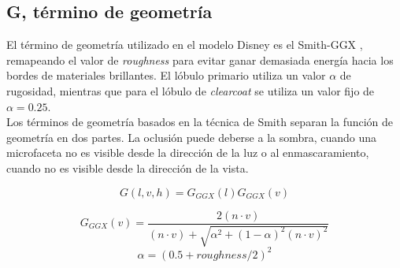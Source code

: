             \subsection*{G, t\'ermino de geometr\'ia}
                El t\'ermino de geometr\'ia utilizado en el modelo Disney \autocite{disney12} es el Smith-GGX \autocite{ggx}, remapeando el valor de \textit{roughness} para evitar
                ganar demasiada energ\'ia hacia los bordes de materiales brillantes. El l\'obulo primario utiliza un valor $\alpha$
                de rugosidad, mientras que para el l\'obulo de \textit{clearcoat} se utiliza un valor fijo de $\alpha = 0.25$.\\

                Los t\'erminos de geometr\'ia basados en la t\'ecnica de Smith \autocite{smith} separan la funci\'on de geometr\'ia en dos partes.
                La oclusi\'on puede deberse a la sombra, cuando una microfaceta no es visible desde la direcci\'on de la luz o al enmascaramiento,
                cuando no es visible desde la direcci\'on de la vista.
    
                $$
                G(l, v, h) = G_{GGX}(l)G_{GGX}(v)
                $$
    
                $$
                G_{GGX}(v) = \frac
                {2 (n \cdot{v})}
                {(n \cdot{v}) + \sqrt{ \alpha^2 + (1 - \alpha)^2 (n \cdot{v})^2 }}
                $$
                \singlespacing
                \begin{equation}
                \alpha = (0.5 + roughness / 2)^2
                \end{equation}
                \singlespacing
    
